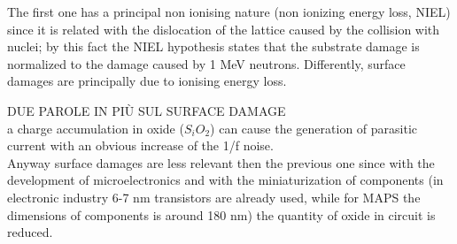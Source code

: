     The first one has a principal non ionising nature (non ionizing energy loss, NIEL) since it is related with the dislocation of the lattice caused by the collision with nuclei; by this fact the NIEL hypothesis states that the substrate damage is normalized to the damage caused by 1 MeV neutrons. Differently, surface damages are principally due to ionising energy loss.

    DUE PAROLE IN PIÙ SUL SURFACE DAMAGE\\
    a charge accumulation in oxide ($S_iO_2$) can cause the generation of parasitic current with an obvious increase of the 1/f noise.\\
    Anyway surface damages are less relevant then the previous one since with the development of microelectronics and with the miniaturization of components (in electronic industry 6-7 nm transistors are already used, while for MAPS the dimensions of components is around 180 nm) the quantity of oxide in circuit is reduced.

